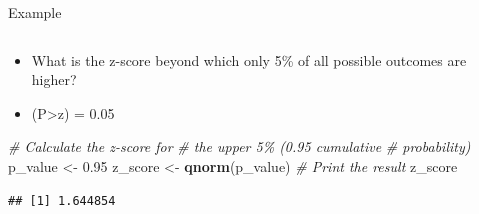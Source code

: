 \documentclass[
  ignorenonframetext,
]{beamer}
\newenvironment{Shaded}{\begin{snugshade}}{\end{snugshade}}
\newcommand{\CommentTok}[1]{\textcolor[rgb]{0.56,0.35,0.01}{\textit{#1}}}
\newcommand{\FloatTok}[1]{\textcolor[rgb]{0.00,0.00,0.81}{#1}}
\newcommand{\FunctionTok}[1]{\textcolor[rgb]{0.13,0.29,0.53}{\textbf{#1}}}
\newcommand{\NormalTok}[1]{#1}
\newcommand{\OtherTok}[1]{\textcolor[rgb]{0.56,0.35,0.01}{#1}}
\providecommand{\tightlist}{%
  \setlength{\itemsep}{0pt}\setlength{\parskip}{0pt}}
\begin{document}
\begin{frame}[fragile]{Example}
\label{example-4}
\begin{columns}[T]
\begin{column}{0.5\textwidth}
\vspace{1cm}

\begin{itemize}
\tightlist
\item
  What is the z-score beyond which only 5\% of all possible outcomes are
  higher?
\end{itemize}

\begin{itemize}
\tightlist
\item
  (P\textgreater z) = 0.05
\end{itemize}

\begin{Shaded}
\begin{Highlighting}[]
\CommentTok{\# Calculate the z{-}score for }
\CommentTok{\# the upper 5\% (0.95 cumulative }
\CommentTok{\# probability)}
\NormalTok{p\_value }\OtherTok{\textless{}{-}} \FloatTok{0.95}
\NormalTok{z\_score }\OtherTok{\textless{}{-}} \FunctionTok{qnorm}\NormalTok{(p\_value)}
\CommentTok{\# Print the result}
\NormalTok{z\_score}
\end{Highlighting}
\end{Shaded}

\begin{verbatim}
## [1] 1.644854
\end{verbatim}
\end{column}

\begin{column}{0.5\textwidth}
\vspace{1cm}


\end{column}
\end{columns}
\end{frame}
\end{document}
